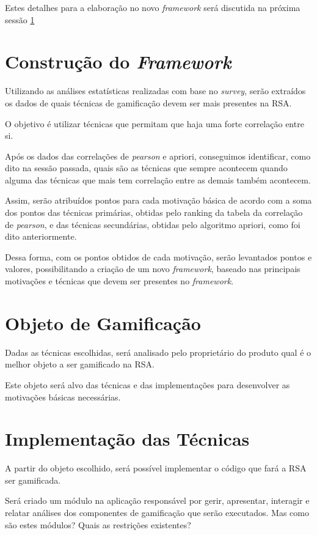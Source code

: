 Estes detalhes para a elaboração no novo \textit{framework} será discutida na próxima sessão \ref{sub:constru_o_do_framework}

\section{Construção do \textit{Framework}}
\label{sub:constru_o_do_framework}
Utilizando as análises estatísticas realizadas com base no \textit{survey}, serão extraídos os dados de quais técnicas de gamificação
devem ser mais presentes na RSA.

O objetivo é  utilizar técnicas que permitam que haja uma forte correlação entre si.

Após os dados das correlações de \textit{pearson} e apriori, conseguimos identificar, como dito na sessão passada, quais são as técnicas
que sempre acontecem quando alguma das técnicas que mais tem correlação entre as demais também acontecem.

Assim, serão atribuídos pontos para cada motivação básica de acordo com a soma dos pontos das técnicas primárias, obtidas pelo ranking da
tabela da correlação de \textit{pearson}, e das técnicas secundárias, obtidas pelo algoritmo apriori, como foi dito anteriormente.

Dessa forma, com os pontos obtidos de cada motivação, serão levantados pontos e valores, possibilitando a criação de um novo \textit{framework},
baseado nas principais motivações e técnicas que devem ser presentes no \textit{framework}.

\section{Objeto de Gamificação}
\label{sub:objeto_de_gamifica_o}
Dadas as técnicas escolhidas, será analisado pelo proprietário do produto qual é o melhor objeto a ser gamificado na RSA.

Este objeto será alvo das técnicas e das implementações para desenvolver as motivações básicas necessárias.


\section{Implementação das Técnicas}
\label{sub:implementa_o_das_t_cnicas}
A partir do objeto escolhido, será possível implementar o código que fará a RSA ser gamificada.

Será criado um módulo na aplicação responsável por gerir, apresentar, interagir e relatar análises
dos componentes de gamificação que serão executados. Mas como são estes módulos? Quais as restrições existentes?

